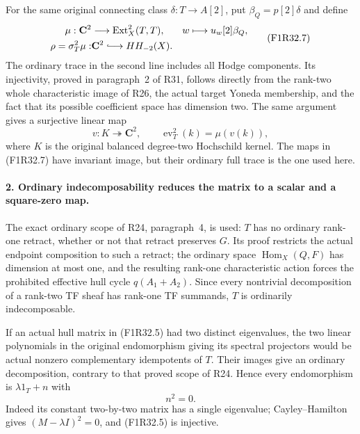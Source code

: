 For the same original connecting
class $\delta:T\to A[2]$, put
$\beta_Q=p[2]\delta$ and define
\[
 \begin{aligned}
 \mu:\mathbf C^2&\longrightarrow\operatorname{Ext}^2_X(T,T),
                         &w&\longmapsto u_w[2]\beta_Q,\\
 \rho=\sigma_T^2\mu:&\mathbf C^2\lhook\joinrel\longrightarrow HH_{-2}(X).
 \end{aligned}
 \tag{F1R32.7}
\]
The ordinary trace in the second
line includes all Hodge components.
Its injectivity, proved in paragraph~2
of R31, follows directly from the
rank-two whole characteristic image
of R26, the actual target Yoneda
membership, and the fact that its
possible coefficient space has
dimension two. The same argument
gives a surjective linear map
\[
          v:K\twoheadrightarrow\mathbf C^2,
                    \qquad\operatorname{ev}_T^2(k)=\mu(v(k)),
 \tag{F1R32.8}
\]
where $K$ is the original balanced
degree-two Hochschild kernel.
The maps in (F1R32.7) have invariant
image, but their ordinary full trace
is the one used here.

\paragraph{2. Ordinary indecomposability reduces the matrix to a scalar and a square-zero map.}
The exact ordinary scope of R24,
paragraph~4, is used: $T$ has no
ordinary rank-one retract, whether
or not that retract preserves $G$.
Its proof restricts the actual
endpoint composition to such a
retract; the ordinary space
$\operatorname{Hom}_X(Q,F)$ has
dimension at most one, and the
resulting rank-one characteristic
action forces the prohibited
effective hull cycle $q(A_1+A_2)$.
Since every nontrivial decomposition
of a rank-two TF sheaf has rank-one
TF summands, $T$ is ordinarily
indecomposable.

If an actual hull matrix in
(F1R32.5) had two distinct eigenvalues,
the two linear polynomials in the
original endomorphism giving its
spectral projectors would be actual
nonzero complementary idempotents
of $T$. Their images give an ordinary
decomposition, contrary to that
proved scope of R24. Hence every
endomorphism is $\lambda 1_T+n$
with
\[
                              n^2=0.
 \tag{F1R32.9}
\]
Indeed its constant two-by-two matrix
has a single eigenvalue; Cayley--Hamilton
gives $(M-\lambda I)^2=0$, and
(F1R32.5) is injective.

